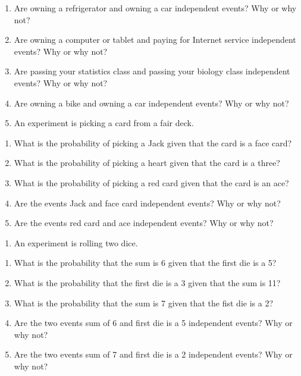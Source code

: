 \documentclass[]{book}
\providecommand{\tightlist}{%
  \setlength{\itemsep}{0pt}\setlength{\parskip}{0pt}}
\begin{document}
\begin{enumerate}
\def\labelenumi{\arabic{enumi}.}
\item
  Are owning a refrigerator and owning a car independent events? Why
  or why not?
\item
  Are owning a computer or tablet and paying for Internet service
  independent events? Why or why not?
\item
  Are passing your statistics class and passing your biology class
  independent events? Why or why not?
\item
  Are owning a bike and owning a car independent events? Why or why
  not?
\item
  An experiment is picking a card from a fair deck.
\end{enumerate}

\begin{enumerate}
\def\labelenumi{\alph{enumi}.}
\item
  What is the probability of picking a Jack given that the card is a
  face card?
\item
  What is the probability of picking a heart given that the card is a
  three?
\item
  What is the probability of picking a red card given that the card is
  an ace?
\item
  Are the events Jack and face card independent events? Why or why
  not?
\item
  Are the events red card and ace independent events? Why or why not?
\end{enumerate}

\begin{enumerate}
\def\labelenumi{\arabic{enumi}.}
\setcounter{enumi}{5}
\tightlist
\item
  An experiment is rolling two dice.
\end{enumerate}

\begin{enumerate}
\def\labelenumi{\alph{enumi}.}
\item
  What is the probability that the sum is 6 given that the first die
  is a 5?
\item
  What is the probability that the first die is a 3 given that the sum
  is 11?
\item
  What is the probability that the sum is 7 given that the fist die is
  a 2?
\item
  Are the two events sum of 6 and first die is a 5 independent events?
  Why or why not?
\item
  Are the two events sum of 7 and first die is a 2 independent events?
  Why or why not?
\end{enumerate}
\end{document}

